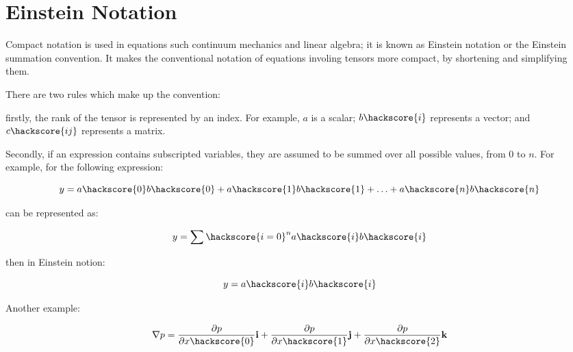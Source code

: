 %
%
%
%
%
%

\section{Einstein Notation}
\label{EINSTEIN NOTATION}

Compact notation is used in equations such continuum mechanics and linear algebra; it is known as Einstein notation or the Einstein summation convention. It makes the conventional notation of equations involing tensors more compact, by shortening and simplifying them.

There are two rules which make up the convention:

firstly, the rank of the tensor is represented by an index. For example, $a$ is a scalar; $b\hackscore{i}$ represents a vector; and $c\hackscore{ij}$ represents a matrix.

Secondly, if an expression contains subscripted variables, they are assumed to be summed over all possible values, from $0$ to $n$. For example, for the following expression:



\begin{equation}
y = a\hackscore{0}b\hackscore{0} + a\hackscore{1}b\hackscore{1} + \ldots + a\hackscore{n}b\hackscore{n}
\label{NOTATION1}
\end{equation}

can be represented as:

\begin{equation}
y = \sum\hackscore{i=0}^n  a\hackscore{i}b\hackscore{i}
\label{NOTATION2}
\end{equation}

then in Einstein notion:

\begin{equation}
y = a\hackscore{i}b\hackscore{i}
\label{NOTATION3}
\end{equation}

Another example:

\begin{equation}
\nabla p = \frac{\partial p}{\partial x\hackscore{0}}\textbf{i} + \frac{\partial p}{\partial x\hackscore{1}}\textbf{j} + \frac{\partial p}{\partial x\hackscore{2}}\textbf{k}
\label{NOTATION4}
\end{equation}

